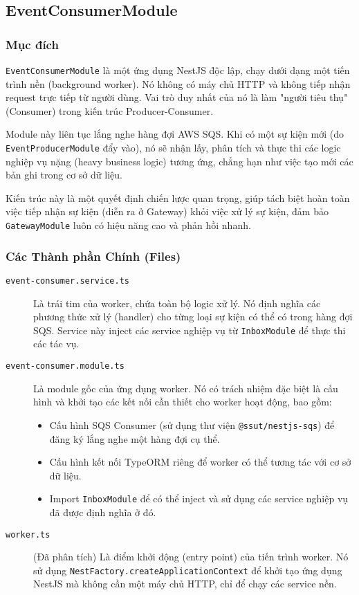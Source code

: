 \subsection{EventConsumerModule}
\label{subsec:eventconsumer-module}

\subsubsection{Mục đích}

\texttt{EventConsumerModule} là một ứng dụng NestJS độc lập, chạy dưới dạng một tiến trình nền (background worker). Nó không có máy chủ HTTP và không tiếp nhận request trực tiếp từ người dùng. Vai trò duy nhất của nó là làm "người tiêu thụ" (Consumer) trong kiến trúc Producer-Consumer.

Module này liên tục lắng nghe hàng đợi AWS SQS. Khi có một sự kiện mới (do \texttt{EventProducerModule} đẩy vào), nó sẽ nhận lấy, phân tích và thực thi các logic nghiệp vụ nặng (heavy business logic) tương ứng, chẳng hạn như việc tạo mới các bản ghi trong cơ sở dữ liệu.

Kiến trúc này là một quyết định chiến lược quan trọng, giúp tách biệt hoàn toàn việc tiếp nhận sự kiện (diễn ra ở Gateway) khỏi việc xử lý sự kiện, đảm bảo \texttt{GatewayModule} luôn có hiệu năng cao và phản hồi nhanh.

\subsubsection{Các Thành phần Chính (Files)}

\begin{description}
    \item[\texttt{event-consumer.service.ts}] Là trái tim của worker, chứa toàn bộ logic xử lý. Nó định nghĩa các phương thức xử lý (handler) cho từng loại sự kiện có thể có trong hàng đợi SQS. Service này inject các service nghiệp vụ từ \texttt{InboxModule} để thực thi các tác vụ.
    
    \item[\texttt{event-consumer.module.ts}] Là module gốc của ứng dụng worker. Nó có trách nhiệm đặc biệt là cấu hình và khởi tạo các kết nối cần thiết cho worker hoạt động, bao gồm:
    \begin{itemize}
        \item Cấu hình SQS Consumer (sử dụng thư viện \texttt{@ssut/nestjs-sqs}) để đăng ký lắng nghe một hàng đợi cụ thể.
        \item Cấu hình kết nối TypeORM riêng để worker có thể tương tác với cơ sở dữ liệu.
        \item Import \texttt{InboxModule} để có thể inject và sử dụng các service nghiệp vụ đã được định nghĩa ở đó.
    \end{itemize}
    
    \item[\texttt{worker.ts}] (Đã phân tích) Là điểm khởi động (entry point) của tiến trình worker. Nó sử dụng \texttt{NestFactory.createApplicationContext} để khởi tạo ứng dụng NestJS mà không cần một máy chủ HTTP, chỉ để chạy các service nền.
\end{description}

